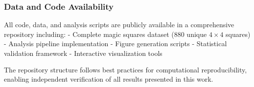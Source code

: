 \subsubsection{Data and Code Availability}

All code, data, and analysis scripts are publicly available in a comprehensive repository including:
- Complete magic squares dataset (880 unique $4 \times 4$ squares)
- Analysis pipeline implementation
- Figure generation scripts
- Statistical validation framework
- Interactive visualization tools

The repository structure follows best practices for computational reproducibility, enabling independent verification of all results presented in this work. 